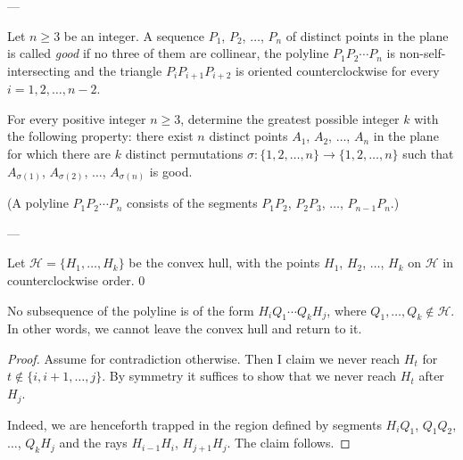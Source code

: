 
---

Let $n\ge3$ be an integer. A sequence $P_1$, $P_2$, $\ldots$, $P_n$ of distinct points in the plane is called \emph{good} if no three of them are collinear, the polyline $P_1P_2\cdots P_n$ is non-self-intersecting and the triangle $P_iP_{i+1}P_{i+2}$ is oriented counterclockwise for every $i=1,2,\ldots,n-2$.

For every positive integer $n\ge3$, determine the greatest possible integer $k$ with the following property: there exist $n$ distinct points $A_1$, $A_2$, $\ldots$, $A_n$ in the plane for which there are $k$ distinct permutations $\sigma:\{1,2,\ldots,n\}\to\{1,2,\ldots,n\}$ such that $A_{\sigma(1)}$, $A_{\sigma(2)}$, $\ldots$, $A_{\sigma(n)}$ is good.

(A polyline $P_1P_2\cdots P_n$ consists of the segments $P_1P_2$, $P_2P_3$, $\ldots$, $P_{n-1}P_n$.)

---

Let $\mathcal H=\{H_1,\ldots,H_k\}$ be the convex hull, with the points $H_1$, $H_2$, $\ldots$, $H_k$ on $\mathcal H$ in counterclockwise order.
\setcounter{iclaim}0
\begin{iclaim}
    No subsequence of the polyline is of the form $H_iQ_1\cdots Q_kH_j$, where $Q_1,\ldots,Q_k\notin\mathcal H$. In other words, we cannot leave the convex hull and return to it.
\end{iclaim}
\begin{proof}
    Assume for contradiction otherwise. Then I claim we never reach $H_t$ for $t\notin\{i,i+1,\ldots,j\}$. By symmetry it suffices to show that we never reach $H_t$ after $H_j$.

    Indeed, we are henceforth trapped in the region defined by segments $H_iQ_1$, $Q_1Q_2$, $\ldots$, $Q_kH_j$ and the rays $H_{i-1}H_i$, $H_{j+1}H_j$. The claim follows.
\end{proof}

